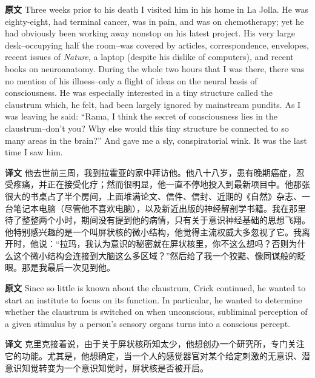 \documentclass[UTF8]{ctexart}
\newenvironment{english}{\par\small\noindent\textbf{原文}\quad\ignorespaces}{\par}
\newenvironment{zhtranslation}{\par\noindent\textbf{译文}\quad\ignorespaces}{\par\vspace{0.35em}}
\begin{document}
\begin{english}
Three weeks prior to his death I visited him in his home in La Jolla. He was eighty-eight, had terminal cancer, was in pain, and was on chemotherapy; yet he had obviously been working away nonstop on his latest project. His very large desk--occupying half the room--was covered by articles, correspondence, envelopes, recent issues of \emph{Nature}, a laptop (despite his dislike of computers), and recent books on neuroanatomy. During the whole two hours that I was there, there was no mention of his illness--only a flight of ideas on the neural basis of consciousness. He was especially interested in a tiny structure called the claustrum which, he felt, had been largely ignored by mainstream pundits. As I was leaving he said: “Rama, I think the secret of consciousness lies in the claustrum--don't you? Why else would this tiny structure be connected to so many areas in the brain?” And gave me a sly, conspiratorial wink. It was the last time I saw him.
\end{english}
\begin{zhtranslation}
他去世前三周，我到拉霍亚的家中拜访他。他八十八岁，患有晚期癌症，忍受疼痛，并正在接受化疗；然而很明显，他一直不停地投入到最新项目中。他那张很大的书桌占了半个房间，上面堆满论文、信件、信封、近期的《自然》杂志、一台笔记本电脑（尽管他不喜欢电脑），以及新近出版的神经解剖学书籍。我在那里待了整整两个小时，期间没有提到他的病情，只有关于意识神经基础的思想飞翔。他特别感兴趣的是一个叫屏状核的微小结构，他觉得主流权威大多忽视了它。我离开时，他说：“拉玛，我认为意识的秘密就在屏状核里，你不这么想吗？否则为什么这个微小结构会连接到大脑这么多区域？”然后给了我一个狡黠、像同谋般的眨眼。那是我最后一次见到他。\end{zhtranslation}

\begin{english}
Since so little is known about the claustrum, Crick continued, he wanted to start an institute to focus on its function. In particular, he wanted to determine whether the claustrum is switched on when unconscious, subliminal perception of a given stimulus by a person's sensory organs turns into a conscious percept.
\end{english}
\begin{zhtranslation}
克里克接着说，由于关于屏状核所知太少，他想创办一个研究所，专门关注它的功能。尤其是，他想确定，当一个人的感觉器官对某个给定刺激的无意识、潜意识知觉转变为一个意识知觉时，屏状核是否被开启。\end{zhtranslation}
\end{document}
